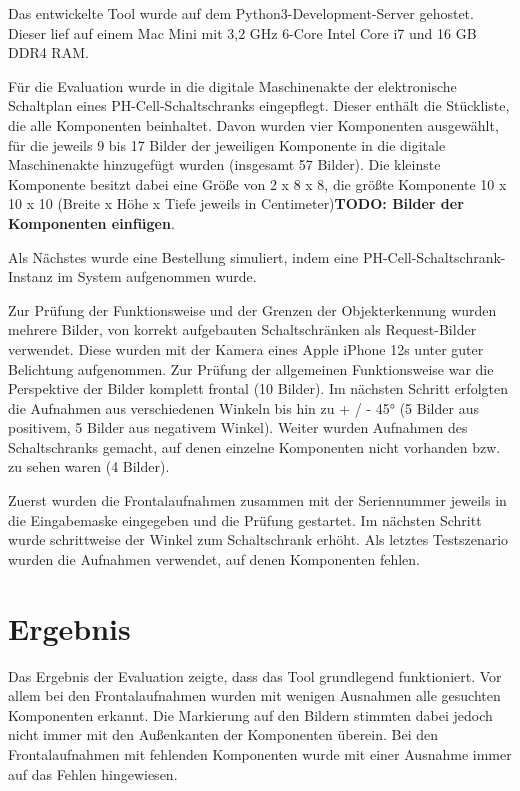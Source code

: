 \documentclass[
    type=Projektarbeit,
    status=draft, %
    language=german, %
    bibengine=bibtex,
]{unibwm-inf-thesis}
\newcommand{\todo}[1]{\textbf{TODO: #1}}
\begin{document}
    Das entwickelte Tool wurde auf dem Python3-Development-Server gehostet.
    Dieser lief auf einem Mac Mini mit 3,2 GHz 6-Core Intel Core i7 und 16 GB DDR4 RAM.

    Für die Evaluation wurde in die digitale Maschinenakte der elektronische Schaltplan eines PH-Cell-Schaltschranks eingepflegt.
    Dieser enthält die Stückliste, die alle Komponenten beinhaltet.
    Davon wurden vier Komponenten ausgewählt, für die jeweils 9 bis 17 Bilder der jeweiligen Komponente in die digitale Maschinenakte hinzugefügt wurden (insgesamt 57 Bilder).
    Die kleinste Komponente besitzt dabei eine Größe von 2 x 8 x 8, die größte Komponente 10 x 10 x 10 (Breite x Höhe x Tiefe jeweils in Centimeter)\todo{Bilder der Komponenten einfügen}.

    Als Nächstes wurde eine Bestellung simuliert, indem eine PH-Cell-Schaltschrank-Instanz im System aufgenommen wurde.

    Zur Prüfung der Funktionsweise und der Grenzen der Objekterkennung wurden mehrere Bilder, von korrekt aufgebauten Schaltschränken als Request-Bilder verwendet.
    Diese wurden mit der Kamera eines Apple iPhone 12s unter guter Belichtung aufgenommen.
    Zur Prüfung der allgemeinen Funktionsweise war die Perspektive der Bilder komplett frontal (10 Bilder).
    Im nächsten Schritt erfolgten die Aufnahmen aus verschiedenen Winkeln bis hin zu + / - 45° (5 Bilder aus positivem, 5 Bilder aus negativem Winkel).
    Weiter wurden Aufnahmen des Schaltschranks gemacht, auf denen einzelne Komponenten nicht vorhanden bzw. zu sehen waren (4 Bilder).

    Zuerst wurden die Frontalaufnahmen zusammen mit der Seriennummer jeweils in die Eingabemaske eingegeben und die Prüfung gestartet.
    Im nächsten Schritt wurde schrittweise der Winkel zum Schaltschrank erhöht.
    Als letztes Testszenario wurden die Aufnahmen verwendet, auf denen Komponenten fehlen.

    \section{Ergebnis}
    Das Ergebnis der Evaluation zeigte, dass das Tool grundlegend funktioniert.
    Vor allem bei den Frontalaufnahmen wurden mit wenigen Ausnahmen alle gesuchten Komponenten erkannt.
    Die Markierung auf den Bildern stimmten dabei jedoch nicht immer mit den Außenkanten der Komponenten überein.
    Bei den Frontalaufnahmen mit fehlenden Komponenten wurde mit einer Ausnahme immer auf das Fehlen hingewiesen.
\end{document}
